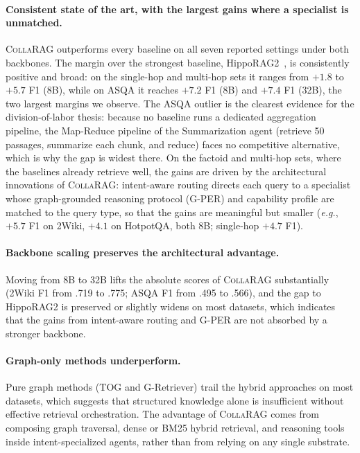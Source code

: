 \documentclass[11pt,a4paper]{article}
\newcommand{\sys}{\textsc{CollaRAG}}
\newcommand{\eg}{\textit{e.g.}}
\begin{document}
\paragraph{Consistent state of the art, with the largest gains where a specialist is unmatched.}
\sys{} outperforms every baseline on all seven reported settings under both backbones.
The margin over the strongest baseline, HippoRAG2~\citep{gutierrez2025hipporag2}, is consistently positive and broad: on the single-hop and multi-hop sets it ranges from $+1.8$ to $+5.7$ F1 (8B), while on ASQA it reaches $+7.2$ F1 (8B) and $+7.4$ F1 (32B), the two largest margins we observe.
The ASQA outlier is the clearest evidence for the division-of-labor thesis: because no baseline runs a dedicated aggregation pipeline, the Map-Reduce pipeline of the Summarization agent (retrieve 50 passages, summarize each chunk, and reduce) faces no competitive alternative, which is why the gap is widest there.
On the factoid and multi-hop sets, where the baselines already retrieve well, the gains are driven by the architectural innovations of \sys{}: intent-aware routing directs each query to a specialist whose graph-grounded reasoning protocol (G-PER) and capability profile are matched to the query type, so that the gains are meaningful but smaller (\eg, $+5.7$ F1 on 2Wiki, $+4.1$ on HotpotQA, both 8B; single-hop $+4.7$ F1).

\paragraph{Backbone scaling preserves the architectural advantage.}
Moving from 8B to 32B lifts the absolute scores of \sys{} substantially (2Wiki F1 from .719 to .775; ASQA F1 from .495 to .566), and the gap to HippoRAG2 is preserved or slightly widens on most datasets, which indicates that the gains from intent-aware routing and G-PER are not absorbed by a stronger backbone.

\paragraph{Graph-only methods underperform.}
Pure graph methods (TOG and G-Retriever) trail the hybrid approaches on most datasets, which suggests that structured knowledge alone is insufficient without effective retrieval orchestration.
The advantage of \sys{} comes from composing graph traversal, dense or BM25 hybrid retrieval, and reasoning tools inside intent-specialized agents, rather than from relying on any single substrate.
\end{document}
